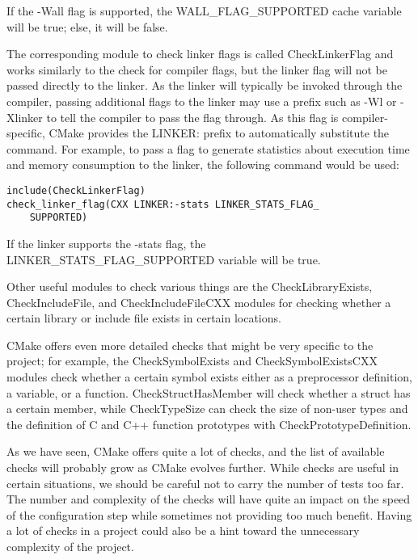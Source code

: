 If the -Wall flag is supported, the WALL\_FLAG\_SUPPORTED cache variable will be true; else, it will be false.

The corresponding module to check linker flags is called CheckLinkerFlag and works similarly to the check for compiler flags, but the linker flag will not be passed directly to the linker. As the linker will typically be invoked through the compiler, passing additional flags to the linker may use a prefix such as -Wl or -Xlinker to tell the compiler to pass  the flag through. As this flag is compiler-specific, CMake provides the LINKER: prefix to automatically substitute the command. For example, to pass a flag to generate statistics about execution time and memory consumption to the linker, the following command would be used:

\begin{lstlisting}[style=styleCMake]
include(CheckLinkerFlag)
check_linker_flag(CXX LINKER:-stats LINKER_STATS_FLAG_
	SUPPORTED)
\end{lstlisting}

If the linker supports the -stats flag, the LINKER\_STATS\_FLAG\_SUPPORTED variable will be true.

Other useful modules to check various things are the CheckLibraryExists, CheckIncludeFile, and CheckIncludeFileCXX modules for checking whether a certain library or include file exists in certain locations.

CMake offers even more detailed checks that might be very specific to the project; for example, the CheckSymbolExists and CheckSymbolExistsCXX modules check whether a certain symbol exists either as a preprocessor definition, a variable, or a function. CheckStructHasMember will check whether a struct has a certain member, while CheckTypeSize can check the size of non-user types and the definition of C and C++ function prototypes with CheckPrototypeDefinition.

As we have seen, CMake offers quite a lot of checks, and the list of available checks will probably grow as CMake evolves further. While checks are useful in certain situations, we should be careful not to carry the number of tests too far. The number and complexity of the checks will have quite an impact on the speed of the configuration step while sometimes not providing too much benefit. Having a lot of checks in a project could also be a hint toward the unnecessary complexity of the project.
